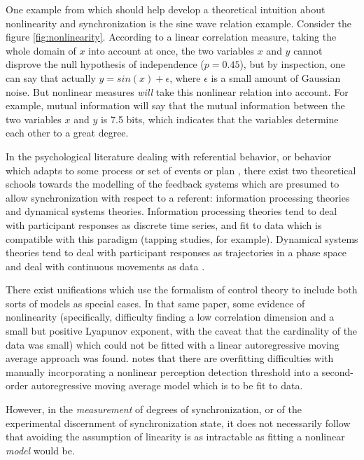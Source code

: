 \documentclass[12pt]{article}
\begin{document}
One example from \cite{anscombe} which should help develop a theoretical intuition about nonlinearity and synchronization is the sine wave relation example. Consider the figure \ref{fig:nonlinearity}. According to a linear correlation measure, taking the whole domain of $x$ into account at once, the two variables $x$ and $y$ cannot disprove the null hypothesis of independence ($p=0.45$), but by inspection, one can say that actually $y = sin(x) + \epsilon$, where $\epsilon$ is a small amount of Gaussian noise. But nonlinear measures \emph{will} take this nonlinear relation into account. For example, mutual information will say that the mutual information between the two variables $x$ and $y$ is 7.5 bits, which indicates that the variables determine each other to a great degree.


In the psychological literature dealing with referential behavior, or behavior which adapts to some process or set of events or plan \cite{pressing}, there exist two theoretical schools towards the modelling of the feedback systems which are presumed to allow synchronization with respect to a referent: information processing theories and dynamical systems theories. Information processing theories tend to deal with participant responses as discrete time series, and fit to data which is compatible with this paradigm (tapping studies, for example). Dynamical systems theories tend to deal with participant responses as trajectories in a phase space and deal with continuous movements as data \cite{syncreview}.

There exist unifications \cite{pressing} which use the formalism of control theory to include both sorts of models as special cases. In that same paper, some evidence of nonlinearity (specifically, difficulty finding a low correlation dimension and a small but positive Lyapunov exponent, with the caveat that the cardinality of the data was small) which could not be fitted with a linear autoregressive moving average approach was found. \cite{schulze} notes that there are overfitting difficulties with manually incorporating a nonlinear perception detection threshold into a second-order autoregressive moving average model which is to be fit to data.

However, in the \emph{measurement} of degrees of synchronization, or of the experimental discernment of synchronization state, it does not necessarily follow that avoiding the assumption of linearity is as intractable as fitting a nonlinear \emph{model} would be.
\end{document}
